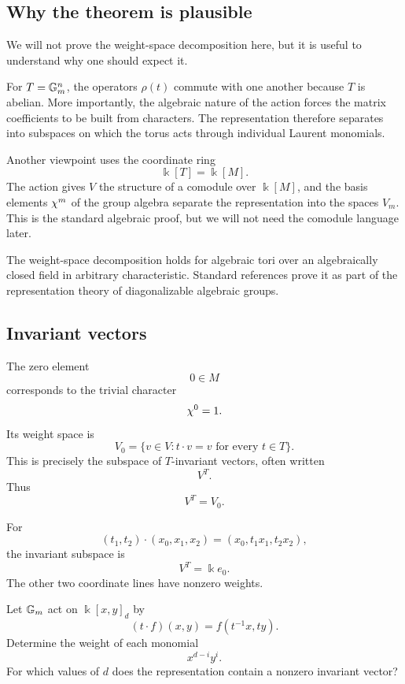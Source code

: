 \subsection{Why the theorem is plausible}

We will not prove the weight-space decomposition here, but it is useful
to understand why one should expect it.

For \(T=\mathbb{G}_{m}^n\), the operators \(\rho(t)\) commute with one another
because \(T\) is abelian. More importantly, the algebraic nature of the
action forces the matrix coefficients to be built from characters.
The representation therefore separates into subspaces on which the
torus acts through individual Laurent monomials.

\begin{observation}
Another viewpoint uses the coordinate ring
\[
\Bbbk[T]=\Bbbk[M].
\]
The action gives \(V\) the structure of a comodule over
\(\Bbbk[M]\), and the basis elements \(\chi^{m}\) of the group
algebra separate the representation into the spaces \(V_m\). This is
the standard algebraic proof, but we will not need the comodule
language later.
\end{observation}

\begin{observation}
The weight-space decomposition holds for algebraic tori over an
algebraically closed field in arbitrary characteristic. Standard
references prove it as part of the representation theory of
diagonalizable algebraic groups.
\end{observation}

\subsection{Invariant vectors}

The zero element
\[
0\in M
\]
corresponds to the trivial character
\[
\chi^{0}=1.
\]
Its weight space is
\[
V_0
=
\{v\in V:t\cdot v=v\text{ for every }t\in T\}.
\]
This is precisely the subspace of \(T\)-invariant vectors, often
written
\[
V^T.
\]
Thus
\[
V^T=V_0.
\]

\begin{example}
For
\[
(t_1,t_2)\cdot(x_0,x_1,x_2)
=
(x_0,t_1x_1,t_2x_2),
\]
the invariant subspace is
\[
V^T=\Bbbk e_0.
\]
The other two coordinate lines have nonzero weights.
\end{example}

\begin{pauseandthink}
Let \(\mathbb{G}_{m}\) act on \(\Bbbk[x,y]_d\) by
\[
(t\cdot f)(x,y)=f(t^{-1}x,ty).
\]
Determine the weight of each monomial
\[
x^{d-i}y^i.
\]
For which values of \(d\) does the representation contain a nonzero
invariant vector?
\end{pauseandthink}

